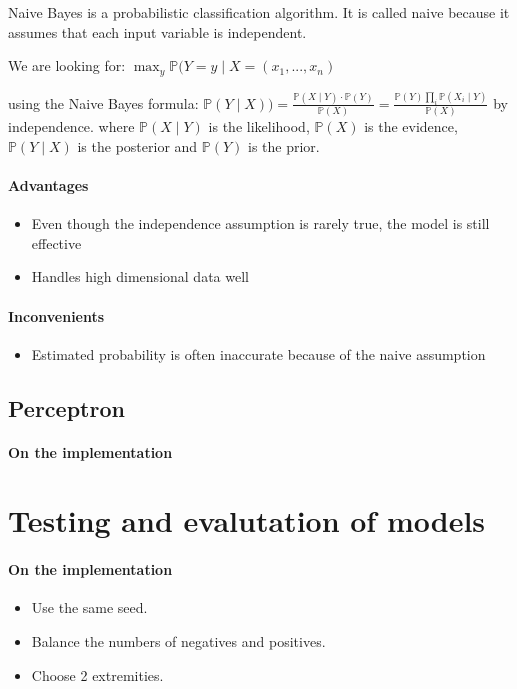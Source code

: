 \documentclass{article}
\begin{document}
Naive Bayes is a probabilistic classification algorithm.
It is called naive because it assumes that each input variable is independent.

We are looking for: $ \max_{y}\mathbb{P}(Y =y \mid X=(x_1, ..., x_n) $

using the Naive Bayes formula: $\mathbb{P}(Y \mid X)) = \frac{\mathbb{P}(X\mid Y)\cdot \mathbb{P}(Y)}{\mathbb{P}(X)} = \frac{\mathbb{P}(Y)\prod_{i}^{}\mathbb{P}(X_i\mid Y)}{\mathbb{P}(X)}$
by independence.
where $\mathbb{P}(X\mid Y)$ is the likelihood, $\mathbb{P}(X)$ is the evidence, $\mathbb{P}(Y \mid X)$ is the posterior and $\mathbb{P}(Y)$ is the prior.


\paragraph{Advantages} \begin{itemize}
\item Even though the independence assumption is rarely true, the model is still effective
\item Handles high dimensional data well
\end{itemize}

\paragraph{Inconvenients} \begin{itemize}
\item Estimated probability is often inaccurate because of the naive assumption
\end{itemize}
\subsection{Perceptron}

\paragraph{On the implementation}

\section{Testing and evalutation of models}

\paragraph{On the implementation} \begin{itemize}
  \item Use the same seed.
  \item Balance the numbers of negatives and positives.
  \item Choose 2 extremities.
\end{itemize}

\printbibliography
\end{document}
